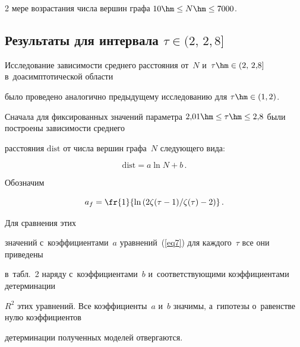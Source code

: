 \begin{multicols}{2}
мере воз\-рас\-та\-ния чис\-ла вершин графа $10\hm\leq N\hm\leq 7000$.





\vspace*{-6pt}



\subsection{Результаты для интервала $\tau\in(2,\,2{,}8]$}



\vspace*{-2pt}





Исследование зависимости сред\-не\-го рас\-сто\-яния от~$N$ и~$\tau\hm\in(2,\,2{,}8]$ в~до\-асимп\-то\-ти\-че\-ской об\-ласти

было проведено аналогично предыду\-ще\-му исследованию для $\tau\hm\in(1,2)$.

Сначала для фиксированных значений па\-ра\-мет\-ра $2{,}01\hm\leq\tau\hm\leq 2{,}8$ были построены зависимости сред\-не\-го

рас\-сто\-яния $\mathrm{dist}$ от чис\-ла вершин графа~$N$ сле\-ду\-юще\-го вида:

\begin{equation}

\label{eq7}

\mathrm{dist} = a \ln N + b\,.

\end{equation}



Обозначим 

$$

a_f=\fr{1}{\ln\left({2\zeta(\tau-1)}/{\zeta(\tau)}-2\right)}\,.

$$

 Для сравнения этих

значений с~коэффициентами~$a$ уравнений~(\ref{eq7}) для каждого~$\tau$ все они приведены

в~табл.~2 наряду с~коэффициентами~$b$ и~со\-от\-вет\-ст\-ву\-ющи\-ми коэффициентами детерминации

$R^2$ этих уравнений. Все коэффициенты~$a$ и~$b$ значимы, а~гипотезы о~ра\-венст\-ве нулю коэффициентов

детерминации полученных моделей отвергаются.






\end{multicols}

